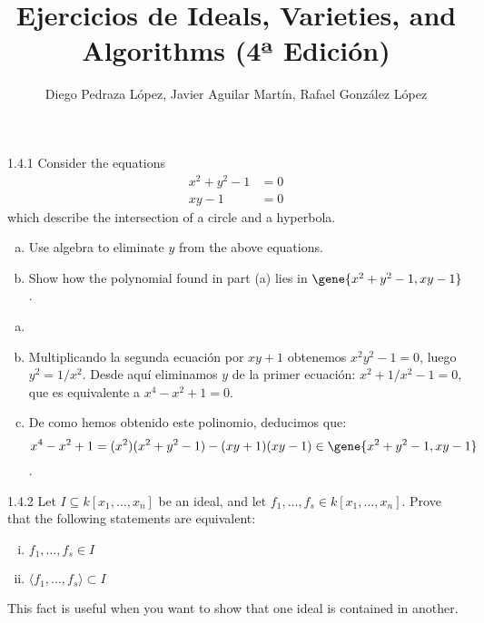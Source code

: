 \documentclass[twoside]{article}
\begin{document}
\title{Ejercicios de Ideals, Varieties, and Algorithms (4ª Edición)}
\author{Diego Pedraza López, Javier Aguilar Martín, Rafael González López}
\maketitle

\begin{ejercicio}{1.4.1}
Consider the equations
\begin{align*}
x^2 + y^2 -1 & = 0\\
xy - 1 & = 0
\end{align*}
which describe the intersection of a circle and a hyperbola.
\begin{enumerate}[a.]
\item Use algebra to eliminate $y$ from the above equations.
\item Show how the polynomial found in part (a) lies in $\gene{x^2+y^2-1, xy-1}$.
\end{enumerate}
\end{ejercicio}

\begin{solucion}
\begin{enumerate}[a.]
\item[]
\item Multiplicando la segunda ecuación por $xy+1$ obtenemos $x^2y^2-1=0$, luego $y^2 = 1/x^2$.
Desde aquí eliminamos $y$ de la primer ecuación: $x^2+1/x^2-1=0$, que es equivalente a $x^4-x^2+1=0$.
\item De como hemos obtenido este polinomio, deducimos que: $$x^4-x^2+1 = (x^2)(x^2+y^2-1)-(xy+1)(xy-1) \in \gene{x^2+y^2-1, xy-1}$$.
\end{enumerate}


\end{solucion}

\newpage

\begin{ejercicio}{1.4.2}
Let $I \subseteq k[x_1,\dots,x_n]$ be an ideal, and let $f_1,\dots,f_s \in k[x_1,\dots,x_n]$. Prove that the following statements are equivalent:
\begin{enumerate}[(i)]
\item $f_1,\dots,f_s \in I$
\item $\langle f_1,\dots,f_s\rangle \subset I$
\end{enumerate}
This fact is useful when you want to show that one ideal is contained in another.
\end{ejercicio}
\end{document}
